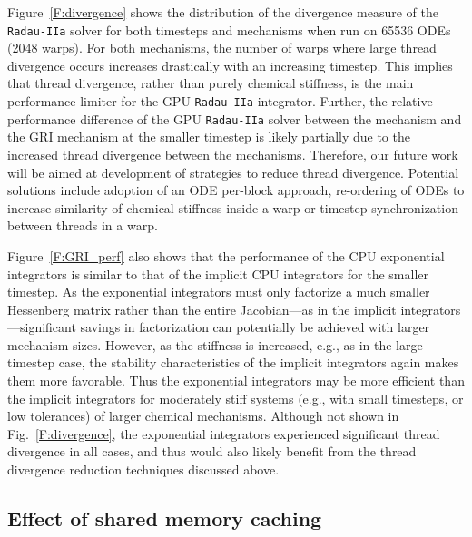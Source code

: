 \documentclass[preprint]{elsarticle}
\begin{document}
Figure~\ref{F:divergence} shows the distribution of the divergence measure of the \texttt{Radau-IIa} solver for both timesteps and mechanisms when run on \num{65536} ODEs (\num{2048} warps).
For both mechanisms, the number of warps where large thread divergence occurs increases drastically with an increasing timestep.
This implies that thread divergence, rather than purely chemical stiffness, is the main performance limiter for the GPU \texttt{Radau-IIa} integrator.
Further, the relative performance difference of the GPU \texttt{Radau-IIa} solver between the  mechanism and the GRI mechanism at the smaller timestep is likely partially due to the increased thread divergence between the mechanisms.
Therefore, our future work will be aimed at development of strategies to reduce thread divergence.
Potential solutions include adoption of an ODE per-block approach, re-ordering of ODEs to increase similarity of chemical stiffness inside a warp or timestep synchronization between threads in a warp.

Figure~\ref{F:GRI_perf} also shows that the performance of the CPU exponential integrators is similar to that of the implicit CPU integrators for the smaller timestep.
As the exponential integrators must only factorize a much smaller Hessenberg matrix rather than the entire Jacobian---as in the implicit integrators---significant savings in factorization can potentially be achieved with larger mechanism sizes.
However, as the stiffness is increased, e.g., as in the large timestep case, the stability characteristics of the implicit integrators again makes them more favorable.
Thus the exponential integrators may be more efficient than the implicit integrators for moderately stiff systems (e.g., with small timesteps, or low tolerances) of larger chemical mechanisms.
Although not shown in Fig.~\ref{F:divergence}, the exponential integrators experienced significant thread divergence in all cases, and thus would also likely benefit from the thread divergence reduction techniques discussed above.

\subsection{Effect of shared memory caching}
\label{S:smem}
\end{document}
